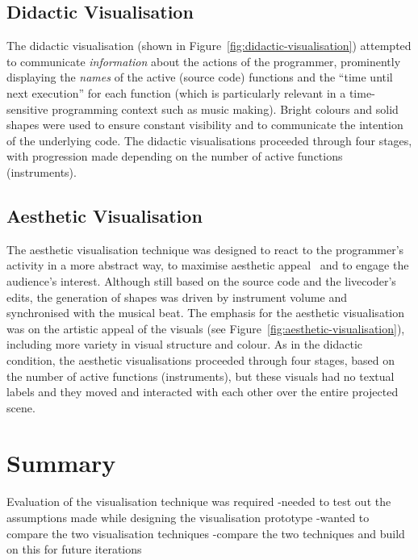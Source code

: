 \subsection{Didactic Visualisation}
\label{sec:didactic-visualisation}

The didactic visualisation (shown in Figure~\ref{fig:didactic-visualisation}) attempted to communicate \emph{information} about the actions of the programmer, prominently displaying the \emph{names} of the active (source code) functions and the ``time until next execution'' for each function (which is particularly relevant in a time-sensitive programming context such as music making). Bright colours and solid shapes were used to ensure constant visibility and to communicate the intention of the underlying code. The didactic visualisations proceeded through four stages, with progression made depending on the number of active functions (instruments).

\subsection{Aesthetic Visualisation}
\label{sec:aesthetic-visualisation}

The aesthetic visualisation technique was designed to react to the programmer's activity in a more abstract way, to maximise aesthetic appeal~\cite{Cawthon2007} and to engage the audience's interest. Although still based on the source code and the livecoder's edits, the generation of shapes was driven by instrument volume and synchronised with the musical beat. The emphasis for the aesthetic visualisation was on the artistic appeal of the visuals (see Figure~\ref{fig:aesthetic-visualisation}), including more variety in visual structure and colour. As in the didactic condition, the aesthetic visualisations proceeded through four stages, based on the number of active functions (instruments), but these visuals had no textual labels and they moved and interacted with each other over the entire projected scene.

\section{Summary}

Evaluation of the visualisation technique was required 
-needed to test out the assumptions made while designing the visualisation prototype
-wanted to compare the two visualisation techniques
-compare the two techniques and build on this for future iterations



